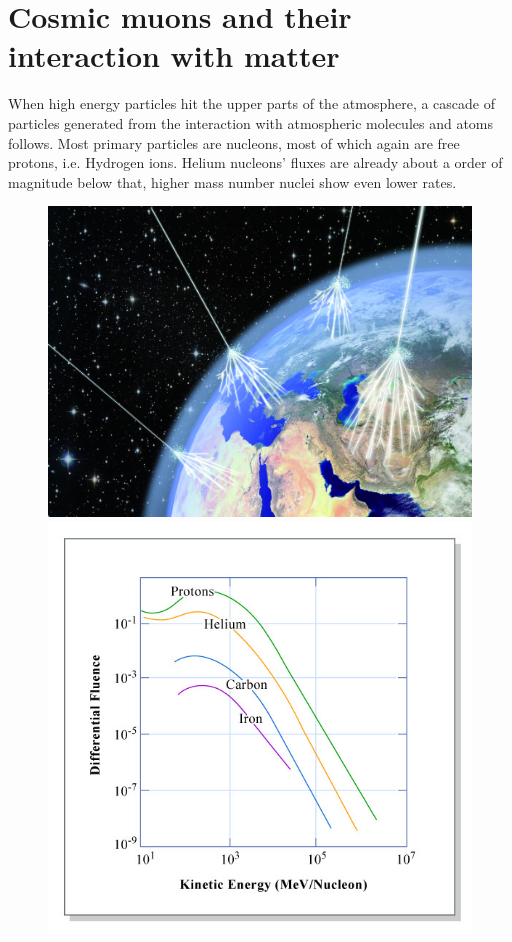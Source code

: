     \section{Cosmic muons and their interaction with matter}
    \label{ch:introduction:sec:Cosmic Air Showers}
    When high energy particles hit the upper parts of the atmosphere, a cascade of particles generated from the interaction with atmospheric molecules and atoms follows. Most primary particles are nucleons, most of which again are free protons, i.e. Hydrogen ions. Helium nucleons' fluxes are already about a order of magnitude below that, higher mass number nuclei show even lower rates\cite{highEnergyCosmicRays}. 
    \begin{figure}
	\begin{minipage}[d]{0.49 \textwidth}
		  \includegraphics[width=\textwidth]{graphics/cosmicRays/cosmicRays.jpg}
	\end{minipage}
	\begin{minipage}[d]{0.49 \textwidth}
		  \includegraphics[width=\textwidth]{graphics/cosmicRays/energySpectrum.jpg}

\end{minipage}
\end{figure}
